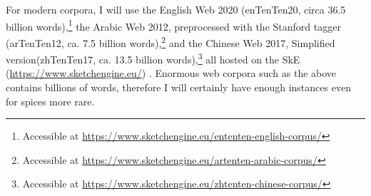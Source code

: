 




For modern corpora, I will use the English Web 2020 (enTenTen20, circa 36.5 billion words),\footnote{Accessible at \url{https://www.sketchengine.eu/ententen-english-corpus/}} the Arabic Web 2012, preprocessed with the Stanford tagger (arTenTen12, ca. 7.5 billion words),\footnote{Accessible at \url{https://www.sketchengine.eu/artenten-arabic-corpus/}} and the Chinese Web 2017, Simplified version(zhTenTen17, ca. 13.5 billion words),\footnote{Accessible at \url{https://www.sketchengine.eu/zhtenten-chinese-corpus/}} all hosted on the \gls{SkE} (\url{https://www.sketchengine.eu/}) \autocite{kilgarriff_sketch_2004,kilgarriff_sketch_2014}. Enormous web corpora such as the above contains billions of words, therefore I will certainly have enough instances even for spices more rare.

